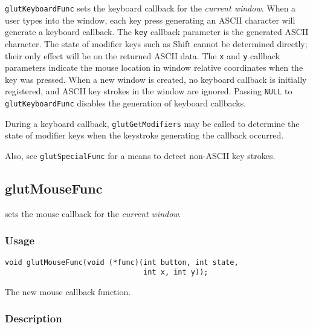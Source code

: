 {\tt glutKeyboardFunc} sets the keyboard callback for the {\em current window}.
When a user types into the window, each key press generating an ASCII character
will generate a keyboard callback.  The {\tt key} callback parameter is the 
generated ASCII character.  The state of modifier keys such as Shift cannot be
determined directly; their only effect will be on the returned ASCII data.
The {\tt x} and {\tt y} callback
parameters indicate the mouse location in window relative coordinates
when the key was pressed.  When a new window is created, no keyboard
callback is initially registered, and ASCII key strokes in the window are
ignored.  
Passing {\tt NULL} to {\tt glutKeyboardFunc} disables
the generation of keyboard callbacks.

During a keyboard callback, {\tt glutGetModifiers} may be called to determine
the state of modifier keys when the keystroke generating the callback occurred.

Also, see {\tt glutSpecialFunc} for a means to detect non-ASCII key strokes.

\subsection{glutMouseFunc}

 sets the mouse callback for the {\em current window}.

\subsubsection*{Usage}

\begin{verbatim}
void glutMouseFunc(void (*func)(int button, int state,
                                int x, int y));
\end{verbatim}
\begin{description}
\itemsep 0in
\item[{\tt func}]
The new mouse callback function.
\end{description}

\subsubsection*{Description}

